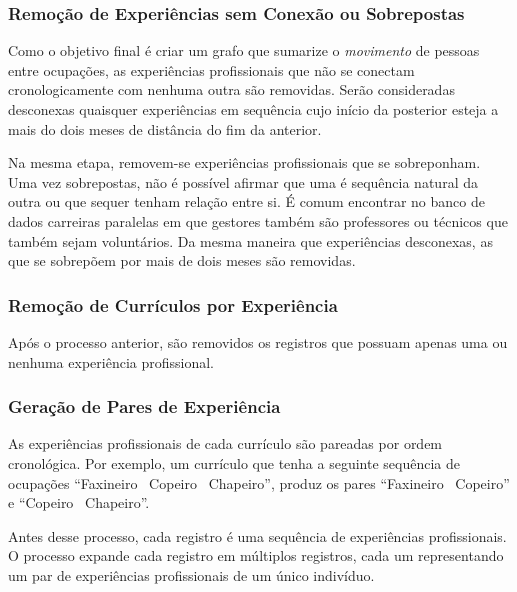 \documentclass[12pt,a4paper,final]{article}
\begin{document}

\subsubsection{Remoção de Experiências sem Conexão ou Sobrepostas}

Como o objetivo final é criar um grafo que sumarize o \textit{movimento} de pessoas entre ocupações, as experiências profissionais que não se conectam cronologicamente com nenhuma outra são removidas. Serão consideradas desconexas quaisquer experiências em sequência cujo início da posterior esteja a mais do dois meses de distância do fim da anterior.


Na mesma etapa, removem-se experiências profissionais que se sobreponham. Uma vez sobrepostas, não é possível afirmar que uma é sequência natural da outra ou que sequer tenham relação entre si. É comum encontrar no banco de dados carreiras paralelas em que gestores também são professores ou técnicos que também sejam voluntários. Da mesma maneira que experiências desconexas, as que se sobrepõem por mais de dois meses são removidas.

\subsubsection{Remoção de Currículos por Experiência}

Após o processo anterior, são removidos os registros que possuam apenas uma ou nenhuma experiência profissional.

\subsubsection{Geração de Pares de Experiência}

As experiências profissionais de cada currículo são pareadas por ordem cronológica. Por exemplo, um currículo que tenha a seguinte sequência de ocupações \enquote{Faxineiro \textrightarrow~Copeiro \textrightarrow~Chapeiro}, produz os pares \enquote{Faxineiro \textrightarrow~Copeiro} e \enquote{Copeiro \textrightarrow~Chapeiro}.

Antes desse processo, cada registro é uma sequência de experiências profissionais. O processo expande cada registro em múltiplos registros, cada um representando um par de experiências profissionais de um único indivíduo.
\end{document}
